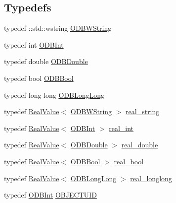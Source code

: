 \subsection*{Typedefs}
\begin{DoxyCompactItemize}
\item 
typedef \+::std\+::wstring \hyperlink{namespace_n_m_1_1_o_d_b_a161b9ce7f87980e7c8eb8ff025ce2bfb}{O\+D\+B\+W\+String}
\item 
typedef int \hyperlink{namespace_n_m_1_1_o_d_b_acf98aab2c033b53aaf56ea6f29bdfebc}{O\+D\+B\+Int}
\item 
typedef double \hyperlink{namespace_n_m_1_1_o_d_b_aab2fa1265921c1a3dfe688e6d9ed74b0}{O\+D\+B\+Double}
\item 
typedef bool \hyperlink{namespace_n_m_1_1_o_d_b_a9e7aa4d096ccb752b1251596f1728865}{O\+D\+B\+Bool}
\item 
typedef long long \hyperlink{namespace_n_m_1_1_o_d_b_a3c16fb1fdbac58c8888df8dccc9e8353}{O\+D\+B\+Long\+Long}
\item 
typedef \hyperlink{class_n_m_1_1_o_d_b_1_1_real_value}{Real\+Value}$<$ \hyperlink{namespace_n_m_1_1_o_d_b_a161b9ce7f87980e7c8eb8ff025ce2bfb}{O\+D\+B\+W\+String} $>$ \hyperlink{namespace_n_m_1_1_o_d_b_a1253623839775f675b83137b1b1d2eea}{real\+\_\+string}
\item 
typedef \hyperlink{class_n_m_1_1_o_d_b_1_1_real_value}{Real\+Value}$<$ \hyperlink{namespace_n_m_1_1_o_d_b_acf98aab2c033b53aaf56ea6f29bdfebc}{O\+D\+B\+Int} $>$ \hyperlink{namespace_n_m_1_1_o_d_b_a26974c6ae050437cf6dd2c7e680e9f31}{real\+\_\+int}
\item 
typedef \hyperlink{class_n_m_1_1_o_d_b_1_1_real_value}{Real\+Value}$<$ \hyperlink{namespace_n_m_1_1_o_d_b_aab2fa1265921c1a3dfe688e6d9ed74b0}{O\+D\+B\+Double} $>$ \hyperlink{namespace_n_m_1_1_o_d_b_a7ac7e14198555160d04917c61d489cd0}{real\+\_\+double}
\item 
typedef \hyperlink{class_n_m_1_1_o_d_b_1_1_real_value}{Real\+Value}$<$ \hyperlink{namespace_n_m_1_1_o_d_b_a9e7aa4d096ccb752b1251596f1728865}{O\+D\+B\+Bool} $>$ \hyperlink{namespace_n_m_1_1_o_d_b_a35501430d0cd9713ef5d32a79e4f546e}{real\+\_\+bool}
\item 
typedef \hyperlink{class_n_m_1_1_o_d_b_1_1_real_value}{Real\+Value}$<$ \hyperlink{namespace_n_m_1_1_o_d_b_a3c16fb1fdbac58c8888df8dccc9e8353}{O\+D\+B\+Long\+Long} $>$ \hyperlink{namespace_n_m_1_1_o_d_b_afd47e24435091d2bb616b270d5e70f56}{real\+\_\+longlong}
\item 
typedef \hyperlink{namespace_n_m_1_1_o_d_b_acf98aab2c033b53aaf56ea6f29bdfebc}{O\+D\+B\+Int} \hyperlink{namespace_n_m_1_1_o_d_b_a262b64fab56baaa96e18bac4ada88265}{O\+B\+J\+E\+C\+T\+U\+I\+D}

\end{DoxyCompactItemize}
